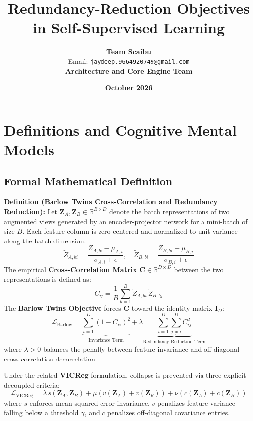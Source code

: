 \documentclass[11pt,a4paper]{article}
\title{\textbf{Redundancy-Reduction Objectives in Self-Supervised Learning}}
\author{\textbf{Team Scaibu} \\ \small Email: \texttt{jaydeep.9664920749@gmail.com} \\ \small \textbf{Architecture and Core Engine Team}}
\date{\textbf{October 2026}}
\theoremstyle{definition}
\begin{document}
\maketitle

\section{Definitions and Cognitive Mental Models}

\subsection{Formal Mathematical Definition}
\textbf{Definition (Barlow Twins Cross-Correlation and Redundancy Reduction):}
Let $\mathbf{Z}_A, \mathbf{Z}_B \in \mathbb{R}^{B \times D}$ denote the batch representations of two augmented views generated by an encoder-projector network for a mini-batch of size $B$. Each feature column is zero-centered and normalized to unit variance along the batch dimension:
{\boldmath
\begin{equation}
\tilde{Z}_{A, bi} = \frac{Z_{A, bi} - \mu_{A, i}}{\sigma_{A, i} + \epsilon}, \quad \tilde{Z}_{B, bi} = \frac{Z_{B, bi} - \mu_{B, i}}{\sigma_{B, i} + \epsilon}
\end{equation}
}
The empirical \textbf{Cross-Correlation Matrix} $\mathbf{C} \in \mathbb{R}^{D \times D}$ between the two representations is defined as:
{\boldmath
\begin{equation}
C_{ij} = \frac{1}{B} \sum_{b=1}^B \tilde{Z}_{A, bi} \, \tilde{Z}_{B, bj}
\end{equation}
}
The \textbf{Barlow Twins Objective} forces $\mathbf{C}$ toward the identity matrix $\mathbf{I}_D$:
{\boldmath
\begin{equation}
\mathcal{L}_{\text{Barlow}} = \underbrace{\sum_{i=1}^D (1 - C_{ii})^2}_{\text{Invariance Term}} + \lambda \underbrace{\sum_{i=1}^D \sum_{j \ne i}^D C_{ij}^2}_{\text{Redundancy Reduction Term}}
\end{equation}
}
where $\lambda > 0$ balances the penalty between feature invariance and off-diagonal cross-correlation decorrelation.

Under the related \textbf{VICReg} formulation, collapse is prevented via three explicit decoupled criteria:
{\boldmath
\begin{equation}
\mathcal{L}_{\text{VICReg}} = \lambda \, s(\mathbf{Z}_A, \mathbf{Z}_B) + \mu \left( v(\mathbf{Z}_A) + v(\mathbf{Z}_B) \right) + \nu \left( c(\mathbf{Z}_A) + c(\mathbf{Z}_B) \right)
\end{equation}
}
where $s$ enforces mean squared error invariance, $v$ penalizes feature variance falling below a threshold $\gamma$, and $c$ penalizes off-diagonal covariance entries.
\end{document}

